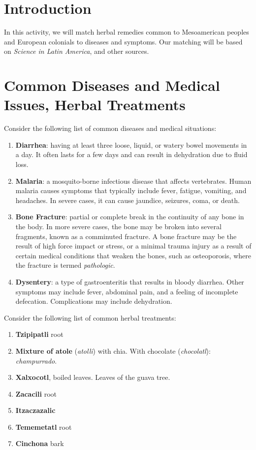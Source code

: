 \documentclass[12pt]{article}
\begin{document}
\maketitle

\section{Introduction}

In this activity, we will match herbal remedies common to Mesoamerican peoples and European colonials to diseases and symptoms.  Our matching will be based on \textit{Science in Latin America}, and other sources.

\section{Common Diseases and Medical Issues, Herbal Treatments}
\label{sec:1}

Consider the following list of common diseases and medical situations:

\begin{enumerate}
\item \textbf{Diarrhea}: having at least three loose, liquid, or watery bowel movements in a day. It often lasts for a few days and can result in dehydration due to fluid loss.
\item \textbf{Malaria}: a mosquito-borne infectious disease that affects vertebrates. Human malaria causes symptoms that typically include fever, fatigue, vomiting, and headaches. In severe cases, it can cause jaundice, seizures, coma, or death.
\item \textbf{Bone Fracture}: partial or complete break in the continuity of any bone in the body. In more severe cases, the bone may be broken into several fragments, known as a comminuted fracture. A bone fracture may be the result of high force impact or stress, or a minimal trauma injury as a result of certain medical conditions that weaken the bones, such as osteoporosis, where the fracture is termed \textit{pathologic}.
\item \textbf{Dysentery}: a type of gastroenteritis that results in bloody diarrhea.  Other symptoms may include fever, abdominal pain, and a feeling of incomplete defecation.  Complications may include dehydration.
\end{enumerate}

Consider the following list of common herbal treatments:
\begin{enumerate}
\item \textbf{Tzipipatli} root
\item \textbf{Mixture of atole} (\textit{atolli}) with chia.  With chocolate (\textit{chocolatl}): \textit{champurrado}.
\item \textbf{Xalxocotl}, boiled leaves.  Leaves of the guava tree.
\item \textbf{Zacacili} root
\item \textbf{Itzaczazalic}
\item \textbf{Tememetatl} root
\item \textbf{Cinchona} bark
\end{enumerate}
\end{document}
